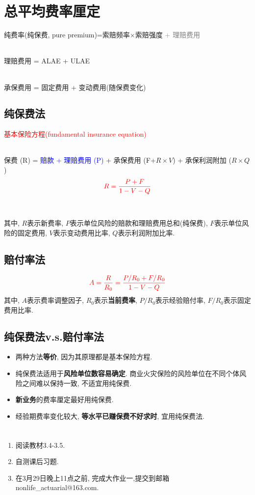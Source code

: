 \documentclass[professionalfont]{beamer}
\newcommand{\red}[1]{\textcolor{red}{#1}}
\newcommand{\green}[1]{\textbf{#1}}
\newcommand{\blue}[1]{\textcolor{blue}{#1}}
\newcommand{\gray}[1]{\textcolor{gray}{#1}}
\begin{document}
\section{总平均费率厘定}
\begin{frame}
	\begin{center}
	纯费率(纯保费, pure premium)=索赔频率$\times$索赔强度 \gray{+ 理赔费用}\\
	
	~
	
	理赔费用 = ALAE + ULAE\\ 
	
	~
	
	承保费用 = 固定费用 + 变动费用(随保费变化)
	\end{center}
\end{frame}
\subsection{纯保费法}
\begin{frame}
\red{基本保险方程(fundamental insurance equation)}\\

~

保费 (R) = \blue{赔款 + 理赔费用 (P)} + 承保费用 (F+$R\times V$) + 承保利润附加 ($R\times Q$)\\
$$\red{R=\frac{P+F}{1-V-Q}}$$

~

其中, $R$表示新费率, $P$表示单位风险的赔款和理赔费用总和(纯保费), $F$表示单位风险的固定费用, $V$表示变动费用比率, $Q$表示利润附加比率.
\end{frame}
\subsection{赔付率法}
\begin{frame}
$$\red{A=\frac{R}{R_0}=\frac{P/R_0+F/R_0}{1-V-Q}}$$
其中, $A$表示费率调整因子, $R_0$表示\green{当前费率}, $P/R_0$表示经验赔付率, $F/R_0$表示固定费用比率.
\end{frame}
\subsection{纯保费法v.s.赔付率法}
\begin{frame}
\begin{itemize}
	\item 两种方法\green{等价}, 因为其原理都是基本保险方程.
	\item 纯保费法适用于\green{风险单位数容易确定}. 商业火灾保险的风险单位在不同个体风险之间难以保持一致, 不适宜用纯保费.
	\item \green{新业务}的费率厘定最好用纯保费.
	\item 经验期费率变化较大, \green{等水平已赚保费不好求时}, 宜用纯保费法.
\end{itemize}
\end{frame}
\section*{}
\begin{frame}
\begin{enumerate}
		\item 阅读教材3.4-3.5. 
		\item 自测课后习题.
		\item 在3月29日晚上11点之前, 完成大作业一,提交到邮箱nonlife\_actuarial@163.com.
\end{enumerate}
\end{frame}
\end{document}
